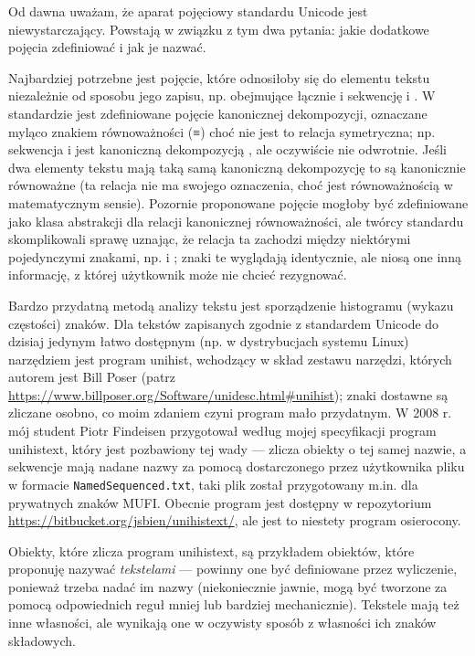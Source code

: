 Od dawna uważam, że aparat pojęciowy standardu Unicode jest
niewystarczający. Powstają w związku z tym dwa pytania: jakie
dodatkowe pojęcia zdefiniować i jak je nazwać.

Najbardziej potrzebne jest pojęcie, które odnosiłoby się do elementu
tekstu niezależnie od sposobu jego zapisu, np. obejmujące łącznie
 i sekwencję  i . W standardzie jest
zdefiniowane pojęcie kanonicznej dekompozycji, oznaczane myląco
znakiem równoważności ({≡}) choć
nie jest to relacja symetryczna; np. sekwencja  i  jest kanoniczną dekompozycją
, ale oczywiście nie
odwrotnie.  Jeśli dwa elementy tekstu mają taką samą kanoniczną
dekompozycję to są kanonicznie równoważne (ta relacja nie ma swojego
oznaczenia, choć jest równoważnością w matematycznym sensie). Pozornie
proponowane pojęcie mogłoby być zdefiniowane jako klasa abstrakcji dla
relacji kanonicznej równoważności, ale twórcy standardu skomplikowali
sprawę uznając, że relacja ta zachodzi między niektórymi pojedynczymi
znakami, np.  i ;
znaki te wyglądają identycznie, ale niosą one inną informację, z
której użytkownik może nie chcieć rezygnować.

Bardzo przydatną metodą analizy tekstu jest sporządzenie histogramu
(wykazu częstości) znaków. Dla tekstów zapisanych zgodnie z standardem
Unicode do dzisiaj jedynym łatwo dostępnym (np. w dystrybucjach
systemu Linux) narzędziem jest program \textsf{unihist}, wchodzący w
skład zestawu narzędzi, których autorem jest Bill Poser (patrz
\url{https://www.billposer.org/Software/unidesc.html#unihist}); znaki dostawne są
zliczane osobno, co moim zdaniem czyni program mało przydatnym. W 2008
r. mój student Piotr Findeisen przygotował według mojej specyfikacji
program \textsf{unihistext}, który jest pozbawiony tej wady --- zlicza
obiekty o tej samej nazwie, a sekwencje mają nadane nazwy za pomocą
dostarczonego przez użytkownika pliku w formacie
\texttt{NamedSequenced.txt}, taki plik został przygotowany m.in. dla
prywatnych znaków MUFI. Obecnie program jest dostępny w repozytorium
\url{https://bitbucket.org/jsbien/unihistext/}, ale jest to niestety
program osierocony.

Obiekty, które zlicza program \textsf{unihistext}, są przykładem
obiektów, które proponuję nazywać \textit{tekstelami} --- powinny one
być definiowane przez wyliczenie, ponieważ trzeba nadać im nazwy
(niekoniecznie jawnie, mogą być tworzone za pomocą odpowiednich reguł
mniej lub bardziej mechanicznie). Tekstele mają też inne własności,
ale wynikają one w oczywisty sposób z własności ich znaków składowych.

